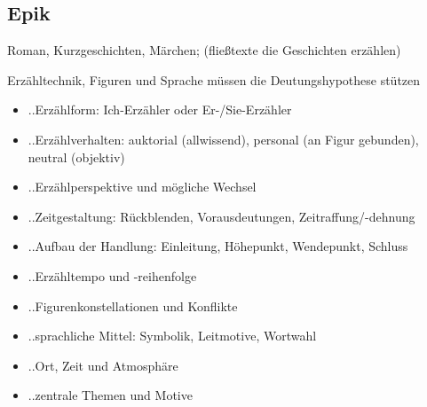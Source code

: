 
\subsection{Epik}

 Roman, Kurzgeschichten, Märchen; (fließtexte die Geschichten erzählen)

 Erzähltechnik, Figuren und Sprache müssen die Deutungshypothese stützen

\begin{itemize}
    \item ..Erzählform: Ich-Erzähler oder Er-/Sie-Erzähler
    \item ..Erzählverhalten: auktorial (allwissend), personal (an Figur gebunden), neutral (objektiv)
    \item ..Erzählperspektive und mögliche Wechsel
    \item ..Zeitgestaltung: Rückblenden, Vorausdeutungen, Zeitraffung/-dehnung
    \item ..Aufbau der Handlung: Einleitung, Höhepunkt, Wendepunkt, Schluss
    \item ..Erzähltempo und -reihenfolge
    \item ..Figurenkonstellationen und Konflikte
    \item ..sprachliche Mittel: Symbolik, Leitmotive, Wortwahl
    \item ..Ort, Zeit und Atmosphäre
    \item ..zentrale Themen und Motive
\end{itemize}


